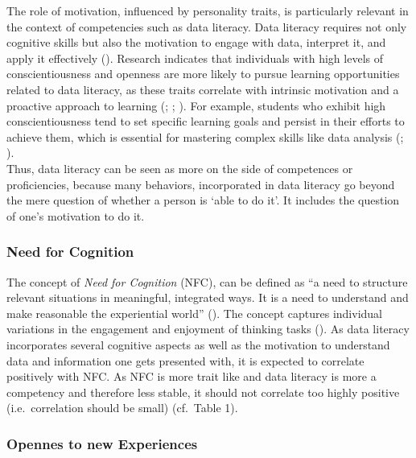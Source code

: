 \documentclass[
  12pt,
  a4paper,
  twoside]{article}
\begin{document}
The role of motivation, influenced by personality traits, is particularly relevant in the context of competencies such as data literacy. Data literacy requires not only cognitive skills but also the motivation to engage with data, interpret it, and apply it effectively (). Research indicates that individuals with high levels of conscientiousness and openness are more likely to pursue learning opportunities related to data literacy, as these traits correlate with intrinsic motivation and a proactive approach to learning (; ; ). For example, students who exhibit high conscientiousness tend to set specific learning goals and persist in their efforts to achieve them, which is essential for mastering complex skills like data analysis (; ).\\
Thus, data literacy can be seen as more on the side of competences or proficiencies, because many behaviors, incorporated in data literacy go beyond the mere question of whether a person is `able to do it'. It includes the question of one's motivation to do it.

\subsubsection{Need for Cognition}\label{need-for-cognition}

The concept of \emph{Need for Cognition} (NFC), can be defined as ``a need to structure relevant situations in meaningful, integrated ways. It is a need to understand and make reasonable the experiential world'' (). The concept captures individual variations in the engagement and enjoyment of thinking tasks (). As data literacy incorporates several cognitive aspects as well as the motivation to understand data and information one gets presented with, it is expected to correlate positively with NFC. As NFC is more trait like and data literacy is more a competency and therefore less stable, it should not correlate too highly positive (i.e.~correlation should be small) (cf.~Table 1).

\subsubsection{Opennes to new Experiences}\label{opennes-to-new-experiences}
\end{document}
